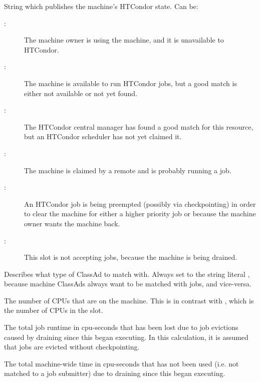 \begin{description}
%
\item[\AdAttr{State}:] String which publishes the machine's HTCondor state.
Can be:
	\begin{description}
	\item[:] The machine owner is using the machine, and
it is unavailable to HTCondor.
	\item[:] The machine is available to run HTCondor jobs,
but a good match is either not available or not 
yet found.
	\item[:] The HTCondor central manager has found a good
match for this resource, but an HTCondor scheduler has not yet claimed it.
	\item[:] The machine is claimed by a remote
 and is probably running a job.
	\item[:] An HTCondor job is being preempted (possibly
via checkpointing) in order to clear the machine for either a higher
priority job or because the machine owner wants the machine back.
	\item[:] This slot is not accepting jobs,
because the machine is being drained.
	\end{description}   %
%
\item[\AdAttr{TargetType}:] Describes what type of ClassAd to match with.
Always set to the string literal , because machine ClassAds
always want to be matched with jobs, and vice-versa.
%
\item[\AdAttr{TotalCpus}:] The number of CPUs that are on the machine.
This is in contrast with ,
which is the number of CPUs in the slot.
%
\item[\AdAttr{TotalMachineDrainingBadput}:] The
total job runtime in cpu-seconds that has been lost due to job evictions
caused by draining since this  began executing.  In
this calculation, it is assumed that jobs are evicted without
checkpointing.
%
\item[\AdAttr{TotalMachineDrainingUnclaimedTime}:] The
total machine-wide time in cpu-seconds that has not been used
(i.e. not matched to a job submitter) due to draining since this
 began executing.
%

\end{description}
